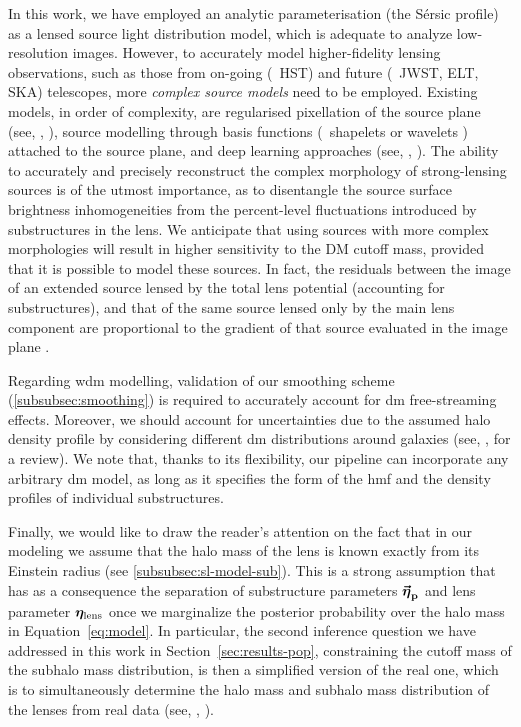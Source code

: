 In this work, we have employed an analytic parameterisation (the Sérsic profile) as a lensed source light distribution model, which is adequate to analyze low-resolution images. However, to accurately model higher-fidelity lensing observations, such as those from on-going (\eg~HST) and future (\eg~JWST, ELT, SKA) telescopes, more \emph{complex source models} need to be employed. Existing models, in order of complexity, are regularised pixellation of the source plane (see, \eg, \cite{Suyu:2006fd, Karchev:2021fro, Vegetti:2008eg}), source modelling through basis functions (\eg~shapelets \citep{Birrer:2018xgm} or wavelets \citep{Galan:2020mnn}) attached to the source plane, and deep learning approaches (see, \eg, \cite{Adam:2022esz, Morningstar:2019szx}).
The ability to accurately and precisely reconstruct the complex morphology of strong-lensing sources is of the utmost importance, as to disentangle the source surface brightness inhomogeneities from the percent-level fluctuations introduced by substructures in the lens. We anticipate that using sources with more complex morphologies will result in higher sensitivity to the DM cutoff mass, provided that it is possible to model these sources. In fact, the residuals between the image of an extended source lensed by the total lens potential (accounting for substructures), and that of the same source lensed only by the main lens component are proportional to the gradient of that source evaluated in the image plane \citep[Equation 16]{Cyr-Racine:2019aa}. 

Regarding \gls*{wdm} modelling, validation of our smoothing scheme (\autoref{subsubsec:smoothing}) is required to accurately account for \gls*{dm} free-streaming effects. Moreover, we should account for uncertainties due to the assumed halo density profile by considering different \gls*{dm} distributions around galaxies (see, \eg, \cite{Salucci:2018aa} for a review). We note that, thanks to its flexibility, our pipeline can incorporate any arbitrary \gls*{dm} model, as long as it specifies the form of the \gls*{hmf} and the density profiles of individual substructures. 
 
Finally, we would like to draw the reader's attention on the fact that in our modeling we assume that the halo mass of the lens is known exactly from its Einstein radius (see \autoref{subsubsec:sl-model-sub}). 
This is a strong assumption that has as a consequence the separation of substructure parameters $\boldsymbol{\vec{{\bm{\eta}}}_\mathrm{p}}$ and lens parameter $\bm{\eta}_\mathrm{lens}$ once we marginalize the posterior probability over the halo mass in Equation~\eqref{eq:model}.
In particular, the second inference question we have addressed in this work in Section~\ref{sec:results-pop}, constraining the cutoff mass of the subhalo mass distribution, is then a simplified version of the real one, which is to simultaneously determine the halo mass and subhalo mass distribution of the lenses from real data (see, \eg, \cite{Birrer:2017rpp}). 

